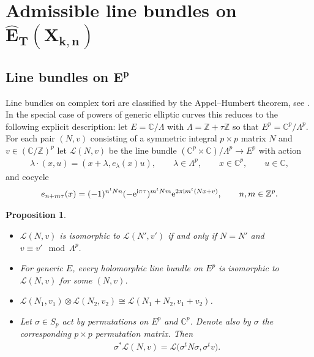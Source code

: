 \documentclass[10pt,a4paper]{amsart}
\numberwithin{equation}{section}
\newtheorem{Proposition}[Theorem]{Proposition}
 { \theoremstyle{definition}
\newtheorem{Definition}[Theorem]{Definition}
\newtheorem{Example}[Theorem]{Example}
\newtheorem{Remark}[Theorem]{Remark} }
\begin{document}
\section[Admissible line bundles on $\hat E_T(X_{k,n})$]{Admissible line bundles on $\boldsymbol{\hat E_T(X_{k,n})}$}\label{s-5}
\subsection[Line bundles on $E^{p}$]{Line bundles on $\boldsymbol{E^{p}}$}\label{ss-alb1}
Line bundles on complex tori are classified by the Appel--Humbert theorem, see \cite[Section~I.2]{Mumford}. In the special case of powers of generic elliptic curves this reduces to the following explicit description: let $E=\mathbb C/\Lambda$ with $\Lambda=\mathbb Z+\tau\mathbb Z$ so that $E^p=\mathbb C^p/\Lambda^p$. For each pair $(N,v)$ consisting of a symmetric integral $p\times p$ matrix $N$ and $v\in(\mathbb C/\mathbb Z)^p$ let $ \mathcal L(N,v)$ be the line bundle \mbox{$(\mathbb C^p\times \mathbb C)/\Lambda^p\to E^p$} with action
\begin{gather*}
 \lambda\cdot(x,u)=(x+\lambda,e_\lambda(x)u),\qquad \lambda\in\Lambda^p, \qquad x\in \mathbb C^p,\qquad u\in \mathbb C,
\end{gather*}
and cocycle
\begin{gather*}
 e_{n+m\tau}(x)=(-1)^{n^tNn}(-{\rm e}^{{\rm i}\pi\tau})^{m^tNm}{\rm e}^{2\pi{\rm i} m^t(Nx+v)}, \qquad n,m\in\mathbb Z^p.
\end{gather*}
\begin{Proposition} \label{p-linebundles} \quad
 \begin{itemize}\itemsep=0pt
 \item[$(i)$] $\mathcal L(N,v)$ is isomorphic to $\mathcal L(N',v')$ if and only if $N=N'$ and $v\equiv v'\mod\Lambda^p$.
 \item[$(ii)$] For generic $E$, every holomorphic line bundle on $E^p$ is isomorphic to $\mathcal L(N,v)$ for some $(N,v)$.
 \item[$(iii)$] $\mathcal L(N_1,v_1)\otimes \mathcal L(N_2,v_2)\cong \mathcal L(N_1+N_2,v_1+v_2)$.
 \item[$(iv)$] Let $\sigma\in S_p$ act by permutations on $E^p$ and $\mathbb C^p$. Denote also by $\sigma$ the corresponding $p\times p$ permutation matrix. Then
 \begin{gather*}\sigma^*\mathcal L(N,v)=\mathcal L\big(\sigma^t N\sigma,\sigma^t v\big).\end{gather*}
 \end{itemize}
\end{Proposition}
\end{document}
